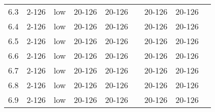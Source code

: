 \documentclass{article}
\begin{document}
\begin{center}
\begin{tabular}{| c | c | c | c | c | c | c | c | c |}
      6.3 & 2-126 & low & 20-126 & 20-126 &  & 20-126 & 20-126 &\\
      6.4 & 2-126 & low & 20-126 & 20-126 &  & 20-126 & 20-126 &\\
      6.5 & 2-126 & low & 20-126 & 20-126 &  & 20-126 & 20-126 &\\
      6.6 & 2-126 & low & 20-126 & 20-126 &  & 20-126 & 20-126 &\\
      6.7 & 2-126 & low & 20-126 & 20-126 &  & 20-126 & 20-126 &\\
      6.8 & 2-126 & low & 20-126 & 20-126 &  & 20-126 & 20-126 &\\
      6.9 & 2-126 & low & 20-126 & 20-126 &  & 20-126 & 20-126 &\\
      \hline
    \end{tabular}
    \end{center}
\end{document}
